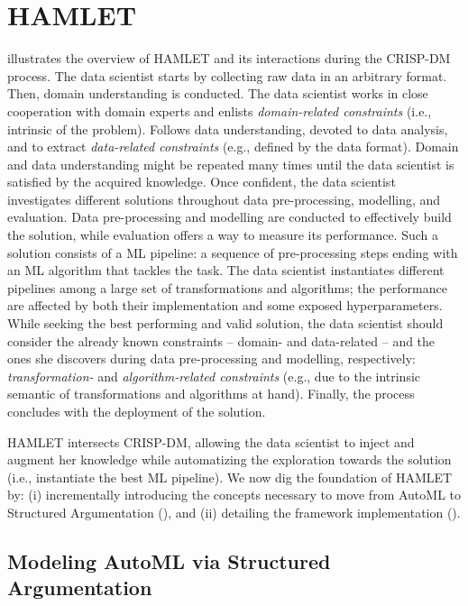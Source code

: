 \section{HAMLET}\label{hamlet-sec:implementation}

 illustrates the overview of HAMLET and its interactions during the CRISP-DM process.
The data scientist starts by collecting raw data in an arbitrary format.
Then, domain understanding is conducted.
The data scientist works in close cooperation with domain experts and enlists \emph{domain-related constraints} (i.e., intrinsic of the problem).
Follows data understanding, devoted to data analysis, and to extract \emph{data-related constraints} (e.g., defined by the data format).
Domain and data understanding might be repeated many times until the data scientist is satisfied by the acquired knowledge.
Once confident, the data scientist investigates different solutions throughout data pre-processing, modelling, and evaluation.
Data pre-processing and modelling are conducted to effectively build the solution, while evaluation offers a way to measure its performance.
Such a solution consists of a ML pipeline: a sequence of pre-processing steps ending with an ML algorithm that tackles the task.
The data scientist instantiates different pipelines among a large set of transformations and algorithms; the performance are affected by both their implementation and some exposed hyperparameters.
While seeking the best performing and valid solution, the data scientist should consider the already known constraints -- domain- and data-related -- and the ones she discovers during data pre-processing and modelling, respectively: \emph{transformation-} and \emph{algorithm-related constraints} (e.g., due to the intrinsic semantic of transformations and algorithms at hand).
Finally, the process concludes with the deployment of the solution.

HAMLET intersects CRISP-DM, allowing the data scientist to inject and augment her knowledge while automatizing the exploration towards the solution (i.e., instantiate the best ML pipeline).
We now dig the foundation of HAMLET by: (i) incrementally introducing the concepts necessary to move from AutoML to Structured Argumentation (), and (ii) detailing the framework implementation  ().

\subsection{Modeling AutoML via Structured Argumentation}
\label{hamlet-ssec:argumentation-formalization}


